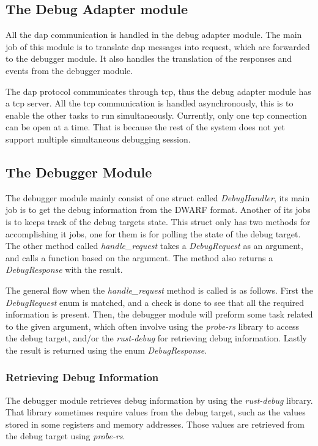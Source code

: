 \subsection{The Debug Adapter module}

All the \gls{dap} communication is handled in the debug adapter module.
The main job of this module is to translate \gls{dap} messages into request, which are forwarded to the debugger module.
It also handles the translation of the responses and events from the debugger module.


The \gls{dap} protocol communicates through \gls{tcp}, thus the debug adapter module has a \gls{tcp} server.
All the \gls{tcp} communication is handled asynchronously, this is to enable the other tasks to run simultaneously.
Currently, only one \gls{tcp} connection can be open at a time.
That is because the rest of the system does not yet support multiple simultaneous debugging session.



\subsection{The Debugger Module}
The debugger module mainly consist of one struct called \emph{DebugHandler}, its main job is to get the debug information from the \gls{DWARF} format.
Another of its jobs is to keeps track of the debug targets state.
This struct only has two methods for accomplishing it jobs, one for them is for polling the state of the debug target.
The other method called \emph{handle\_request} takes a \emph{DebugRequest} as an argument, and calls a function based on the argument.
The method also returns a \emph{DebugResponse} with the result.


The general flow when the \emph{handle\_request} method is called is as follows.
First the \emph{DebugRequest} enum is matched, and a check is done to see that all the required information is present.
Then, the debugger module will preform some task related to the given argument, which often involve using the \emph{probe-rs} library to access the debug target, and/or the \emph{rust-debug} for retrieving debug information.
Lastly the result is returned using the enum \emph{DebugResponse}.



\subsubsection{Retrieving Debug Information}
The debugger module retrieves debug information by using the \emph{rust-debug} library.
That library sometimes require values from the debug target, such as the values stored in some registers and memory addresses.
Those values are retrieved from the debug target using \emph{probe-rs}.



